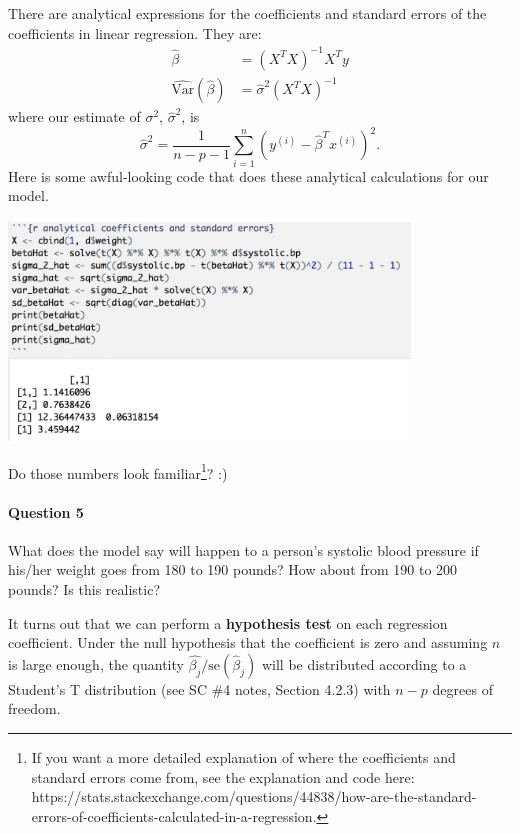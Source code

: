 There are analytical expressions for the coefficients and standard errors of the coefficients in linear regression. They are:
\begin{align*} \hat{\beta} &= (X^T X)^{-1} X^T y \\
\hat{\text{Var}}(\hat{\beta}) &= \hat{\sigma}^2 (X^T X)^{-1}
\end{align*}
where our estimate of $\sigma^2$, $\hat{\sigma}^2$, is
$$ \hat{\sigma}^2 = \frac{1}{n-p-1} \sum_{i=1}^n (y^{(i)} - \hat{\beta}^T x^{(i)})^2.$$ Here is some awful-looking code that does these analytical calculations for our model.

\begin{center}
\includegraphics[width=0.8\textwidth]{img/analytical-coefficients-ses.png}
\end{center}

Do those numbers look familiar\footnote{If you want a more detailed explanation of where the coefficients and standard errors come from, see the explanation and code here: {\color{blue} https://stats.stackexchange.com/questions/44838/how-are-the-standard-errors-of-coefficients-calculated-in-a-regression}.}? :) 

\paragraph{Question 5} What does the model say will happen to a person's systolic blood pressure if his/her weight goes from 180 to 190 pounds? How about from 190 to 200 pounds? Is this realistic?

\vspace{50mm}

It turns out that we can perform a \textbf{hypothesis test} on each regression coefficient. Under the null hypothesis that the coefficient is zero and assuming $n$ is large enough, the quantity $\hat{\beta_j}/\text{se}(\hat{\beta}_j)$ will be distributed according to a Student's T distribution (see SC \#4 notes, Section 4.2.3) with $n-p$ degrees of freedom.

